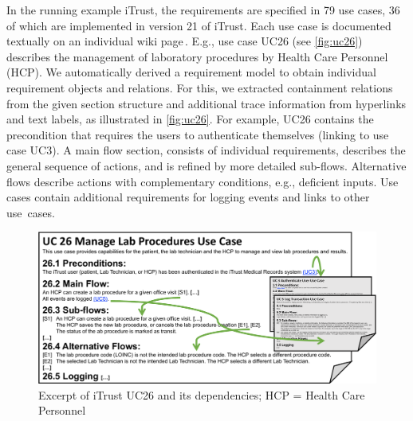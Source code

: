 In the running example iTrust, the requirements are specified in 79 use cases, 36 of which are implemented in version 21 of iTrust.
Each use case is documented textually on an individual wiki page\,\cite{iTrustWiki}.
E.g., use case UC26 (see \autoref{fig:uc26}) describes the management of laboratory procedures by Health Care Personnel (HCP).
We automatically derived a requirement model
to obtain individual requirement objects and relations. %
For this, we extracted containment relations from the given section structure and additional trace information from hyperlinks and text labels, as illustrated in \autoref{fig:uc26}.
%
%
For example, UC26 contains the pre\-condition that requires the users to authenticate themselves (linking to use case UC3).
A main flow section, consists of individual requirements, describes the general sequence of actions, %
and is refined by more detailed sub-flows. %
Alternative flows describe actions with complementary conditions, e.g., deficient inputs. %
Use cases contain additional requirements for logging events and links to other use~cases. %

\begin{figure}
	\centering
	\includegraphics[width=0.9\columnwidth]{figures/UCexample2}
	\caption{Excerpt of iTrust UC26 and its dependencies; HCP = Health Care Personnel}
	\label{fig:uc26}
\end{figure}

